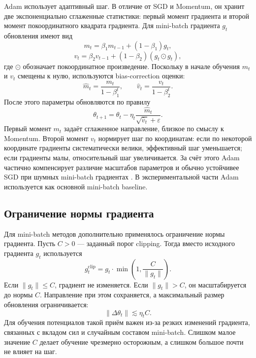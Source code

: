 Adam использует адаптивный шаг. В отличие от SGD и Momentum, он хранит две экспоненциально сглаженные статистики: первый момент градиента и второй момент покоординатного квадрата градиента. Для mini-batch градиента \(g_t\) обновления имеют вид
\begin{equation}
    m_t
    =
    \beta_1 m_{t-1}
    +
    (1-\beta_1)g_t,
\end{equation}
\begin{equation}
    v_t
    =
    \beta_2 v_{t-1}
    +
    (1-\beta_2)(g_t\odot g_t),
\end{equation}
где \(\odot\) обозначает покоординатное произведение. Поскольку в начале обучения \(m_t\) и \(v_t\) смещены к нулю, используются bias-correction оценки:
\begin{equation}
    \widehat m_t
    =
    \frac{m_t}{1-\beta_1^t},
    \qquad
    \widehat v_t
    =
    \frac{v_t}{1-\beta_2^t}.
\end{equation}
После этого параметры обновляются по правилу
\begin{equation}
    \theta_{t+1}
    =
    \theta_t
    -
    \eta_t
    \frac{\widehat m_t}
    {\sqrt{\widehat v_t}+\varepsilon}.
\end{equation}
Первый момент \(m_t\) задаёт сглаженное направление, близкое по смыслу к Momentum. Второй момент \(v_t\) нормирует шаг по координатам: если по некоторой координате градиенты систематически велики, эффективный шаг уменьшается; если градиенты малы, относительный шаг увеличивается. За счёт этого Adam частично компенсирует различие масштабов параметров и обычно устойчивее SGD при шумных mini-batch градиентах \cite{kingma2015adam}. В экспериментальной части Adam используется как основной mini-batch baseline.

\subsection{Ограничение нормы градиента}

Для mini-batch методов дополнительно применялось ограничение нормы градиента. Пусть \(C>0\) --- заданный порог clipping. Тогда вместо исходного градиента \(g_t\) используется
\begin{equation}
    g_t^{\mathrm{clip}}
    =
    g_t
    \cdot
    \min
    \left(
        1,
        \frac{C}{\|g_t\|}
    \right).
\end{equation}
Если \(\|g_t\|\leq C\), градиент не изменяется. Если \(\|g_t\|>C\), он масштабируется до нормы \(C\). Направление при этом сохраняется, а максимальный размер обновления ограничивается:
\begin{equation}
    \|\Delta \theta_t\|
    \lesssim
    \eta_t C.
\end{equation}
Для обучения потенциалов такой приём важен из-за резких изменений градиента, связанных с вкладом сил и случайным составом mini-batch. Слишком малое значение \(C\) делает обучение чрезмерно осторожным, а слишком большое почти не влияет на шаг.

